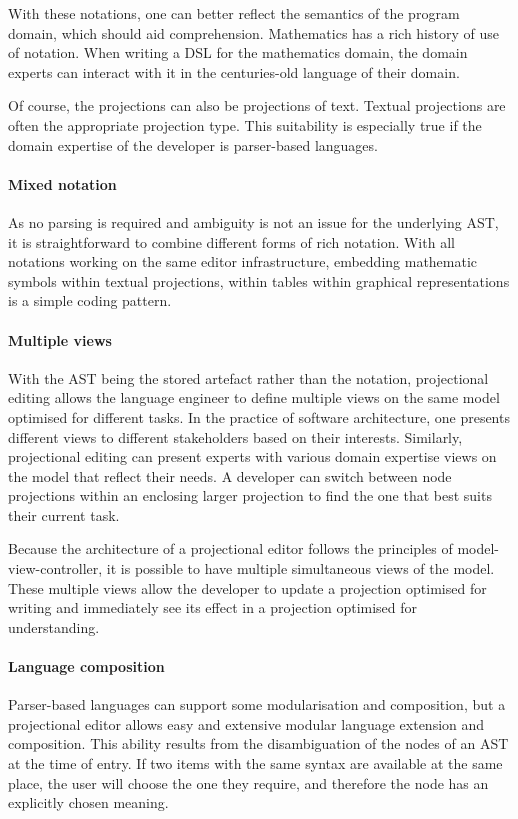 With these notations, one can better reflect the semantics of the program domain, which should aid comprehension.
Mathematics has a rich history of use of notation.
When writing a DSL for the mathematics domain, the domain experts can interact with it in the centuries-old language of their domain.

Of course, the projections can also be projections of text.
Textual projections are often the appropriate projection type.
This suitability is especially true if the domain expertise of the developer is parser-based languages.

\paragraph{Mixed notation} As no parsing is required and ambiguity is not an issue for the underlying AST, it is straightforward to combine different forms of rich notation.
With all notations working on the same editor infrastructure, embedding mathematic symbols within textual projections, within tables within graphical representations is a simple coding pattern.

\paragraph{Multiple views} With the AST being the stored artefact rather than the notation, projectional editing allows the language engineer to define multiple views on the same model optimised for different tasks.
In the practice of software architecture, one presents different views to different stakeholders based on their interests.
Similarly, projectional editing can present experts with various domain expertise views on the model that reflect their needs.
A developer can switch between node projections within an enclosing larger projection to find the one that best suits their current task.

Because the architecture of a projectional editor follows the principles of model-view-controller, it is possible to have multiple simultaneous views of the model.
These multiple views allow the developer to update a projection optimised for writing and immediately see its effect in a projection optimised for understanding.

\paragraph{Language composition} Parser-based languages can support some modularisation and composition, but a projectional editor allows easy and extensive modular language extension and composition.
This ability results from the disambiguation of the nodes of an AST at the time of entry.
If two items with the same syntax are available at the same place, the user will choose the one they require, and therefore the node has an explicitly chosen meaning.

